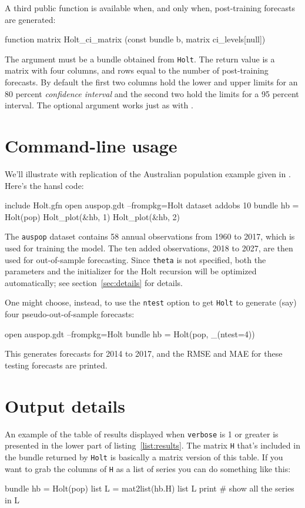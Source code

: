 \documentclass{article}
\begin{document}
A third public function is available when, and only when, post-training
forecasts are generated:
\begin{nscode}
function matrix Holt_ci_matrix (const bundle b, matrix ci_levels[null])
\end{nscode}
The argument must be a bundle obtained from \texttt{Holt}. The return
value is a matrix with four columns, and rows equal to the number of
post-training forecasts. By default the first two columns hold the lower
and upper limits for an 80 percent \textit{confidence interval} and the
second two hold the limits for a 95 percent interval. The optional
 argument works just as with .

\section{Command-line usage}
\label{sec:auto}

We'll illustrate with replication of the Australian population example
given in \citet[section 8.2]{hyndman2021}. Here's the hansl
code:
\begin{nscode}
include Holt.gfn
open auspop.gdt --frompkg=Holt
dataset addobs 10
bundle hb = Holt(pop)
Holt_plot(&hb, 1)
Holt_plot(&hb, 2)
\end{nscode}

The \texttt{auspop} dataset contains 58 annual observations from 1960 to
2017, which is used for training the model. The ten added observations,
2018 to 2027, are then used for out-of-sample forecasting. Since
\texttt{theta} is not specified, both the parameters and the initializer
for the Holt recursion will be optimized automatically; see
section~\ref{sec:details} for details.

One might choose, instead, to use the \texttt{ntest} option to get
\texttt{Holt} to generate (say) four pseudo-out-of-sample forecasts:
\begin{nscode}
open auspop.gdt --frompkg=Holt
bundle hb = Holt(pop, _(ntest=4))
\end{nscode}
This generates forecasts for 2014 to 2017, and the RMSE and MAE for
these testing forecasts are printed.

\section{Output details}
\label{sec:out}

An example of the table of results displayed when \texttt{verbose} is 1
or greater is presented in the lower part of
listing~\ref{list:results}. The matrix \texttt{H} that's included in the
bundle returned by \texttt{Holt} is basically a matrix version of this
table. If you want to grab the columns of \texttt{H} as a list of series
you can do something like this:
\begin{nscode}
bundle hb = Holt(pop)
list L = mat2list(hb.H)
list L print # show all the series in L
\end{nscode}
\end{document}
